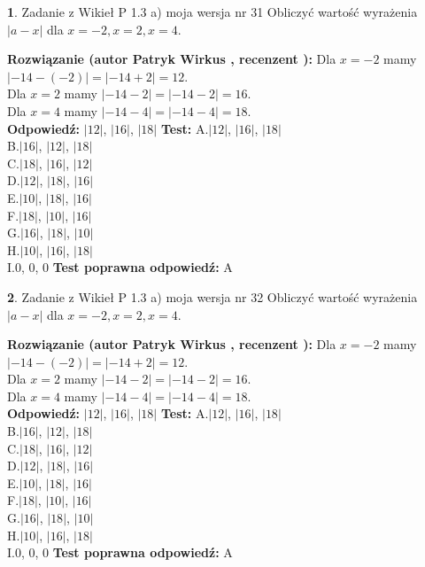 \documentclass[12pt, a4paper]{article}
\theoremstyle{definition} %
\newtheorem{zad}{}
\newcommand{\zadStart}[1]{\begin{zad}#1\newline}
\newcommand{\zadStop}{\end{zad}}
\newcommand{\rozwStart}[2]{\noindent \textbf{Rozwiązanie (autor #1 , recenzent #2): }\newline}
\newcommand{\rozwStop}{\newline}
\newcommand{\odpStart}{\noindent \textbf{Odpowiedź:}\newline}
\newcommand{\odpStop}{\newline}
\newcommand{\testStart}{\noindent \textbf{Test:}\newline}
\newcommand{\testStop}{\newline}
\newcommand{\kluczStart}{\noindent \textbf{Test poprawna odpowiedź:}\newline}
\newcommand{\kluczStop}{\newline}
\begin{document}
\zadStart{Zadanie z Wikieł P 1.3 a) moja wersja nr 31}
Obliczyć wartość wyrażenia $|a - x|$ dla $x=-2,x=2,x=4$.
\zadStop
\rozwStart{Patryk Wirkus}{}
Dla $x = -2$ mamy $|-14 - (-2)| = |-14 + 2| = 12$.\\
Dla $x = 2$ mamy $|-14 - 2| = |-14 - 2| = 16$.\\
Dla $x = 4$ mamy $|-14 - 4| = |-14 - 4| = 18$.\\
\rozwStop
\odpStart
$|12|$, $|16|$, $|18|$
\odpStop
\testStart
A.$|12|$, $|16|$, $|18|$\\
B.$|16|$, $|12|$, $|18|$\\
C.$|18|$, $|16|$, $|12|$\\
D.$|12|$, $|18|$, $|16|$\\
E.$|10|$, $|18|$, $|16|$\\
F.$|18|$, $|10|$, $|16|$\\
G.$|16|$, $|18|$, $|10|$\\
H.$|10|$, $|16|$, $|18|$\\
I.$0$, $0$, $0$
\testStop
\kluczStart
A
\kluczStop



\zadStart{Zadanie z Wikieł P 1.3 a) moja wersja nr 32}
Obliczyć wartość wyrażenia $|a - x|$ dla $x=-2,x=2,x=4$.
\zadStop
\rozwStart{Patryk Wirkus}{}
Dla $x = -2$ mamy $|-14 - (-2)| = |-14 + 2| = 12$.\\
Dla $x = 2$ mamy $|-14 - 2| = |-14 - 2| = 16$.\\
Dla $x = 4$ mamy $|-14 - 4| = |-14 - 4| = 18$.\\
\rozwStop
\odpStart
$|12|$, $|16|$, $|18|$
\odpStop
\testStart
A.$|12|$, $|16|$, $|18|$\\
B.$|16|$, $|12|$, $|18|$\\
C.$|18|$, $|16|$, $|12|$\\
D.$|12|$, $|18|$, $|16|$\\
E.$|10|$, $|18|$, $|16|$\\
F.$|18|$, $|10|$, $|16|$\\
G.$|16|$, $|18|$, $|10|$\\
H.$|10|$, $|16|$, $|18|$\\
I.$0$, $0$, $0$
\testStop
\kluczStart
A
\kluczStop
\end{document}
